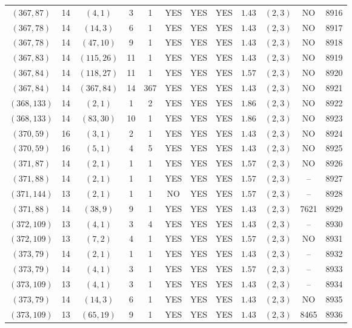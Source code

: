 \begin{longtable}{|c|c|c|c|c|c|c|c|c|c|c|c|}
$(367,87)$ & 14 & $(4,1)$ & 3 & 1 & YES & YES & YES & $1.43$ & $(2,3)$ & NO & 8916\\
$(367,78)$ & 14 & $(14,3)$ & 6 & 1 & YES & YES & YES & $1.43$ & $(2,3)$ & NO & 8917\\
$(367,78)$ & 14 & $(47,10)$ & 9 & 1 & YES & YES & YES & $1.43$ & $(2,3)$ & NO & 8918\\
$(367,83)$ & 14 & $(115,26)$ & 11 & 1 & YES & YES & YES & $1.43$ & $(2,3)$ & NO & 8919\\
$(367,84)$ & 14 & $(118,27)$ & 11 & 1 & YES & YES & YES & $1.57$ & $(2,3)$ & NO & 8920\\
$(367,84)$ & 14 & $(367,84)$ & 14 & 367 & YES & YES & YES & $1.43$ & $(2,3)$ & NO & 8921\\
$(368,133)$ & 14 & $(2,1)$ & 1 & 2 & YES & YES & YES & $1.86$ & $(2,3)$ & NO & 8922\\
$(368,133)$ & 14 & $(83,30)$ & 10 & 1 & YES & YES & YES & $1.86$ & $(2,3)$ & NO & 8923\\
$(370,59)$ & 16 & $(3,1)$ & 2 & 1 & YES & YES & YES & $1.43$ & $(2,3)$ & NO & 8924\\
$(370,59)$ & 16 & $(5,1)$ & 4 & 5 & YES & YES & YES & $1.43$ & $(2,3)$ & NO & 8925\\
$(371,87)$ & 14 & $(2,1)$ & 1 & 1 & YES & YES & YES & $1.57$ & $(2,3)$ & NO & 8926\\
$(371,88)$ & 14 & $(2,1)$ & 1 & 1 & YES & YES & YES & $1.57$ & $(2,3)$ & -- & 8927\\
$(371,144)$ & 13 & $(2,1)$ & 1 & 1 & NO & YES & YES & $1.57$ & $(2,3)$ & -- & 8928\\
$(371,88)$ & 14 & $(38,9)$ & 9 & 1 & YES & YES & YES & $1.43$ & $(2,3)$ & 7621 & 8929\\
$(372,109)$ & 13 & $(4,1)$ & 3 & 4 & YES & YES & YES & $1.43$ & $(2,3)$ & -- & 8930\\
$(372,109)$ & 13 & $(7,2)$ & 4 & 1 & YES & YES & YES & $1.57$ & $(2,3)$ & NO & 8931\\
$(373,79)$ & 14 & $(2,1)$ & 1 & 1 & YES & YES & YES & $1.43$ & $(2,3)$ & -- & 8932\\
$(373,79)$ & 14 & $(4,1)$ & 3 & 1 & YES & YES & YES & $1.57$ & $(2,3)$ & -- & 8933\\
$(373,109)$ & 13 & $(4,1)$ & 3 & 1 & YES & YES & YES & $1.43$ & $(2,3)$ & -- & 8934\\
$(373,79)$ & 14 & $(14,3)$ & 6 & 1 & YES & YES & YES & $1.43$ & $(2,3)$ & NO & 8935\\
$(373,109)$ & 13 & $(65,19)$ & 9 & 1 & YES & YES & YES & $1.43$ & $(2,3)$ & 8465 & 8936\\

\end{longtable}
